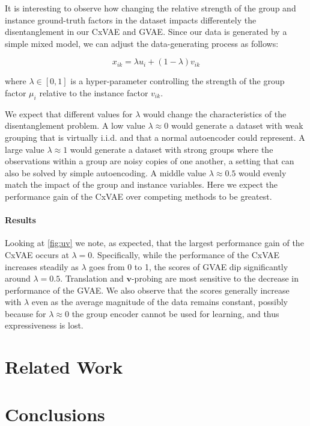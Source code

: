 \documentclass[nohyperref]{article}
\theoremstyle{plain}
\theoremstyle{definition}
\theoremstyle{remark}
\begin{document}
It is interesting to observe how changing the relative strength of the group and instance ground-truth factors in the dataset impacts differentely the disentanglement in our CxVAE and GVAE. Since our data is generated by a simple mixed model, we can adjust the data-generating process as follows:

\begin{equation}
x_{ik} = \lambda u_i + (1 - \lambda) v_{ik}
\end{equation}

where $\lambda \in [0, 1]$ is a hyper-parameter controlling the strength of the group factor $\mu_i$ relative to the instance factor $v_{ik}$. 

We expect that different values for $\lambda$ would change the characteristics of the disentanglement problem. A low value $\lambda \approx 0$ would generate a dataset with weak grouping that is virtually i.i.d. and that a normal autoencoder could represent. A large value $\lambda \approx 1$ would generate a dataset with strong groups where the observations within a group are noisy copies of one another, a setting that can also be solved by simple autoencoding.  A middle value $\lambda \approx 0.5$ would evenly match the impact of the group and instance variables. Here we expect the performance gain of the CxVAE over competing methods to be greatest.

\paragraph{Results} Looking at \cref{fig:uv} we note, as expected, that the largest performance gain of the CxVAE occurs at $\lambda = 0$. Specifically, while the performance of the CxVAE increases steadily as $\lambda$ goes from 0 to 1,  the scores of GVAE dip significantly around $\lambda = 0.5$. Translation and $\mathbf{v}$-probing are most sensitive to the decrease in performance of the GVAE. We also observe that the scores generally increase with $\lambda$ even as the average magnitude of the data remains constant, possibly because for $\lambda \approx 0$ the group encoder cannot be used for learning, and thus expressiveness is lost.

\section{Related Work}

\section{Conclusions}
\end{document}
